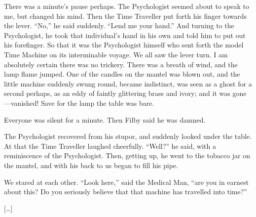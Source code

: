 \documentclass[../book]{subfiles}
\begin{document}
There was a minute’s pause perhaps. The Psychologist seemed about to speak to me, but changed his mind. Then the Time Traveller put forth his finger towards the lever. “No,” he said suddenly. “Lend me your hand.” And turning to the Psychologist, he took that individual’s hand in his own and told him to put out his forefinger. So that it was the Psychologist himself who sent forth the model Time Machine on its interminable voyage. We all saw the lever turn. I am absolutely certain there was no trickery. There was a breath of wind, and the lamp flame jumped. One of the candles on the mantel was blown out, and the little machine suddenly swung round, became indistinct, was seen as a ghost for a second perhaps, as an eddy of faintly glittering brass and ivory; and it was gone—vanished! Save for the lamp the table was bare.

Everyone was silent for a minute. Then Filby said he was damned.

The Psychologist recovered from his stupor, and suddenly looked under the table. At that the Time Traveller laughed cheerfully. “Well?” he said, with a reminiscence of the Psychologist. Then, getting up, he went to the tobacco jar on the mantel, and with his back to us began to fill his pipe.

We stared at each other. “Look here,” said the Medical Man, “are you in earnest about this? Do you seriously believe that that machine has travelled into time?”

[…]
\end{document}

